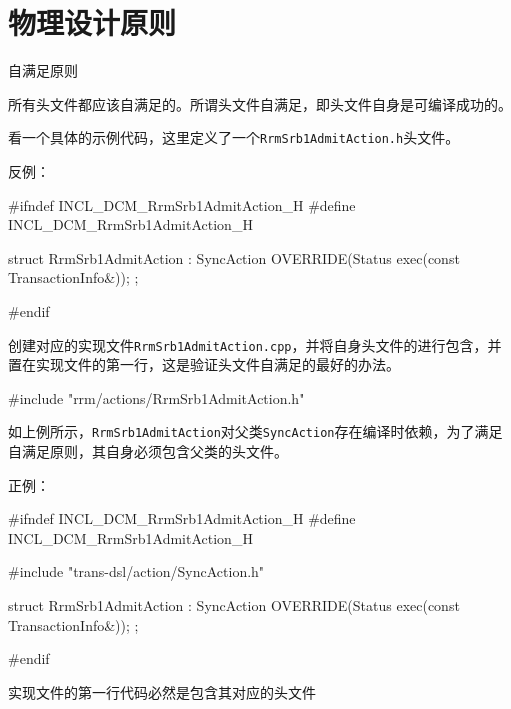 \section{物理设计原则}

\begin{content}

\begin{principle}
自满足原则
\end{principle}

所有头文件都应该自满足的。所谓头文件自满足，即头文件自身是可编译成功的。

看一个具体的示例代码，这里定义了一个\texttt{RrmSrb1AdmitAction.h}头文件。

反例：
\begin{leftbar}
\begin{c++}
#ifndef INCL_DCM_RrmSrb1AdmitAction_H
#define INCL_DCM_RrmSrb1AdmitAction_H

struct RrmSrb1AdmitAction : SyncAction
{
    OVERRIDE(Status exec(const TransactionInfo&));
};

#endif
\end{c++}
\end{leftbar}

创建对应的实现文件\texttt{RrmSrb1AdmitAction.cpp}，并将自身头文件的进行包含，并置在实现文件的第一行，这是验证头文件自满足的最好的办法。

\begin{leftbar}
\begin{c++}
#include "rrm/actions/RrmSrb1AdmitAction.h"
\end{c++}
\end{leftbar}

如上例所示，\texttt{RrmSrb1AdmitAction}对父类\texttt{SyncAction}存在编译时依赖，为了满足自满足原则，其自身必须包含父类的头文件。

正例：
\begin{leftbar}
\begin{c++}
#ifndef INCL_DCM_RrmSrb1AdmitAction_H
#define INCL_DCM_RrmSrb1AdmitAction_H

#include "trans-dsl/action/SyncAction.h"

struct RrmSrb1AdmitAction : SyncAction
{
    OVERRIDE(Status exec(const TransactionInfo&));
};

#endif
\end{c++}
\end{leftbar}

\begin{regulation}
实现文件的第一行代码必然是包含其对应的头文件
\end{regulation}


\end{content}
